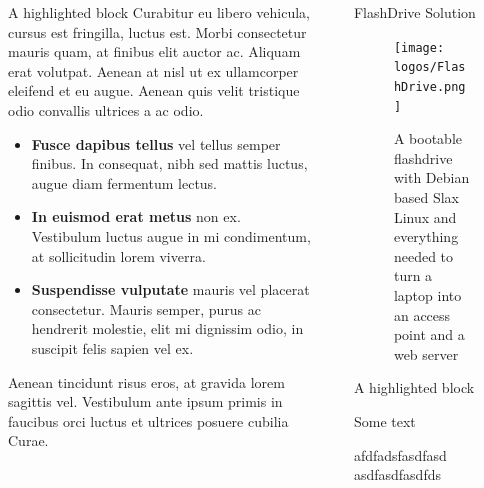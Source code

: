 \documentclass[final]{beamer}
\newlength{\sepwidth}
\newlength{\colwidth}
\newcommand{\separatorcolumn}{\begin{column}{\sepwidth}\end{column}}
\begin{document}
\begin{frame}[t]
\begin{columns}[t]
\begin{column}{\colwidth}
\begin{alertblock}{A highlighted block}
					Curabitur eu libero vehicula, cursus est fringilla, luctus est. Morbi
					consectetur mauris quam, at finibus elit auctor ac. Aliquam erat volutpat.
					Aenean at nisl ut ex ullamcorper eleifend et eu augue. Aenean quis velit
					tristique odio convallis ultrices a ac odio.
					
					\begin{itemize}
						\item \textbf{Fusce dapibus tellus} vel tellus semper finibus. In
						consequat, nibh sed mattis luctus, augue diam fermentum lectus.
						\item \textbf{In euismod erat metus} non ex. Vestibulum luctus augue in
						mi condimentum, at sollicitudin lorem viverra.
						\item \textbf{Suspendisse vulputate} mauris vel placerat consectetur.
						Mauris semper, purus ac hendrerit molestie, elit mi dignissim odio, in
						suscipit felis sapien vel ex.
					\end{itemize}
					
					Aenean tincidunt risus eros, at gravida lorem sagittis vel. Vestibulum ante
					ipsum primis in faucibus orci luctus et ultrices posuere cubilia Curae.
					
				\end{alertblock}
				
			\end{column}
			
			\separatorcolumn
			
			\begin{column}{\colwidth}
				
				\begin{block}{FlashDrive Solution}
					\begin{figure}
						\begin{center}
							\texttt{[image: logos/FlashDrive.png]}
							\caption{A bootable flashdrive with Debian based Slax Linux and everything needed to turn a laptop into an access point and a web server}
						\end{center}
					\end{figure}
				\end{block}
				\begin{alertblock}{A highlighted block}
				
					Some text
				
				\end{alertblock}
				\begin{block}
	afdfadsfasdfasd
	asdfasdfasdfds
	

\end{block}
\end{column}
\end{columns}
\end{frame}
\end{document}
